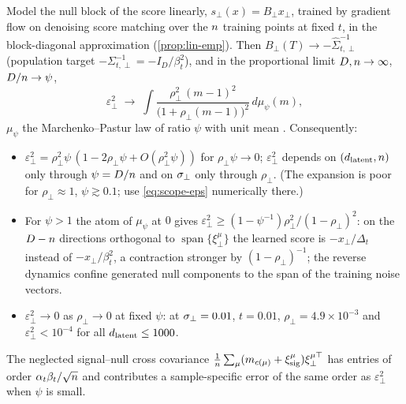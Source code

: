 \begin{proposition}\label{prop:scope-nullspec}
Model the null block of the score linearly, $s_\perp(x)=B_\perp x_\perp$, trained by gradient flow on denoising score matching over the $n$ training points at fixed $t$, in the block-diagonal approximation (\cref{prop:lin-emp}). Then $B_\perp(T)\to-\hat\Sigma_{t,\perp}^{-1}$ (population target $-\Sigma_{t,\perp}^{-1}=-I_D/\beta_t^2$), and in the proportional limit $D,n\to\infty$, $D/n\to\psi$,
\begin{equation}\label{eq:scope-eps}
\varepsilon_\perp^2\;\to\;\int\frac{\rho_\perp^2\,(m-1)^2}{\big(1+\rho_\perp(m-1)\big)^2}\,d\mu_{\psi}(m),
\end{equation}
$\mu_\psi$ the Marchenko--Pastur law of ratio $\psi$ with unit mean \citep{marchenko1967distribution}. Consequently:
\begin{itemize}
\item[(i)] $\varepsilon_\perp^2=\rho_\perp^2\psi\,(1-2\rho_\perp\psi+O(\rho_\perp^2\psi))$ for $\rho_\perp\psi\to0$; $\varepsilon_\perp^2$ depends on $(d_{\mathrm{latent}},n)$ only through $\psi=D/n$ and on $\sigma_{\perp}$ only through $\rho_\perp$. (The expansion is poor for $\rho_\perp\approx1$, $\psi\gtrsim0.1$; use \eqref{eq:scope-eps} numerically there.)
\item[(ii)] For $\psi>1$ the atom of $\mu_\psi$ at $0$ gives $\varepsilon_\perp^2\ge(1-\psi^{-1})\rho_\perp^2/(1-\rho_\perp)^2$: on the $D-n$ directions orthogonal to $\operatorname{span}\{\xi^\mu_\perp\}$ the learned score is $-x_\perp/\Delta_t$ instead of $-x_\perp/\beta_t^2$, a contraction stronger by $(1-\rho_\perp)^{-1}$; the reverse dynamics confine generated null components to the span of the training noise vectors.
\item[(iii)] $\varepsilon_\perp^2\to0$ as $\rho_\perp\to0$ at fixed $\psi$: at $\sigma_{\perp}=0.01$, $t=0.01$, $\rho_\perp=4.9\times10^{-3}$ and $\varepsilon_\perp^2<10^{-4}$ for all $d_{\mathrm{latent}}\le1000$.
\end{itemize}
The neglected signal--null cross covariance $\frac1{n}\sum_\mu(m_{c(\mu)}+\xi^\mu_{\rm sig})\xi^{\mu\top}_\perp$ has entries of order $\alpha_t\beta_t/\sqrt{n}$ and contributes a sample-specific error of the same order as $\varepsilon_\perp^2$ when $\psi$ is small.
\end{proposition}

